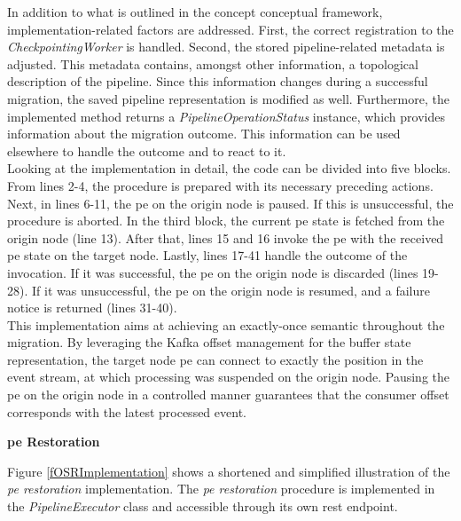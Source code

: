 In addition to what is outlined in the concept conceptual framework, implementation-related factors are addressed. First, the correct registration to the \textit{CheckpointingWorker} is handled. Second, the stored pipeline-related metadata is adjusted. This metadata contains, amongst other information, a topological description of the pipeline. Since this information changes during a successful migration, the saved pipeline representation is modified as well. Furthermore, the implemented method returns a \textit{PipelineOperationStatus} instance, which provides information about the migration outcome. This information can be used elsewhere to handle the outcome and to react to it.\\
Looking at the implementation in detail, the code can be divided into five blocks. From lines 2-4, the procedure is prepared with its necessary preceding actions. Next, in lines 6-11, the \gls{pe} on the origin node is paused. If this is unsuccessful, the procedure is aborted. In the third block, the current \gls{pe} state is fetched from the origin node (line 13). After that, lines 15 and 16 invoke the \gls{pe} with the received \gls{pe} state on the target node. Lastly, lines 17-41 handle the outcome of the invocation. If it was successful, the \gls{pe} on the origin node is discarded (lines 19-28). If it was unsuccessful, the \gls{pe} on the origin node is resumed, and a failure notice is returned (lines 31-40).\\
This implementation aims at achieving an exactly-once semantic throughout the migration. By leveraging the Kafka offset management for the buffer state representation, the target node \gls{pe} can connect to exactly the position in the event stream, at which processing was suspended on the origin node. Pausing the \gls{pe} on the origin node in a controlled manner guarantees that the consumer offset corresponds with the latest processed event.\par



\textbf{\acrlong{pe} Restoration}\par

Figure \ref{fOSRImplementation} shows a shortened and simplified illustration of the \textit{\acrshort{pe} restoration} implementation. The \textit{\acrshort{pe} restoration} procedure is implemented in the \textit{PipelineExecutor} class and accessible through its own \gls{rest} endpoint.\par

